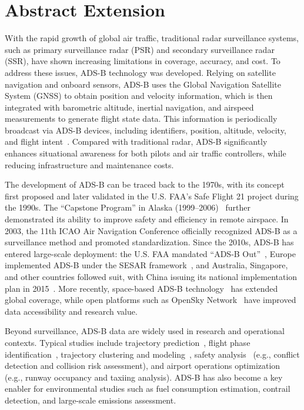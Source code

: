 \section{Abstract Extension}

With the rapid growth of global air traffic, traditional radar surveillance systems, such as primary surveillance radar (PSR) and secondary surveillance radar (SSR), have shown increasing limitations in coverage, accuracy, and cost. To address these issues, ADS-B technology was developed. Relying on satellite navigation and onboard sensors, ADS-B uses the Global Navigation Satellite System (GNSS) to obtain position and velocity information, which is then integrated with barometric altitude, inertial navigation, and airspeed measurements to generate flight state data. This information is periodically broadcast via ADS-B devices, including identifiers, position, altitude, velocity, and flight intent~\cite{olive2024filtering}. Compared with traditional radar, ADS-B significantly enhances situational awareness for both pilots and air traffic controllers, while reducing infrastructure and maintenance costs.

The development of ADS-B can be traced back to the 1970s, with its concept first proposed and later validated in the U.S. FAA’s Safe Flight 21 project during the 1990s. The “Capstone Program” in Alaska (1999–2006)~\cite{faa2000capstone} further demonstrated its ability to improve safety and efficiency in remote airspace. In 2003, the 11th ICAO Air Navigation Conference officially recognized ADS-B as a surveillance method and promoted standardization. Since the 2010s, ADS-B has entered large-scale deployment: the U.S. FAA mandated “ADS-B Out”~\cite{cfr91-225}, Europe implemented ADS-B under the SESAR framework~\cite{undertaking2009european}, and Australia, Singapore, and other countries followed suit, with China issuing its national implementation plan in 2015~\cite{caac2015adsb}. More recently, space-based ADS-B technology~\cite{melero2024satera} has extended global coverage, while open platforms such as OpenSky Network~\cite{schafer2014bringing} have improved data accessibility and research value.

Beyond surveillance, ADS-B data are widely used in research and operational contexts. Typical studies include trajectory prediction~\cite{wang2021performance,corrado2021clustering}, flight phase identification~\cite{schlosser2024analysis}, trajectory clustering and modeling~\cite{guleriamachine}, safety analysis~\cite{noh2018aviation} (e.g., conflict detection and collision risk assessment), and airport operations optimization~\cite{roosenbrand2023contrail} (e.g., runway occupancy and taxiing analysis). ADS-B has also become a key enabler for environmental studies such as fuel consumption estimation, contrail detection, and large-scale emissions assessment.


